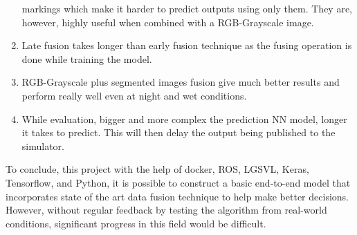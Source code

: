 \begin{enumerate}
        markings which make it harder to predict outputs using only them. They are,
        however, highly useful when combined with a RGB-Grayscale image.
    \item Late fusion takes longer than early fusion technique as the fusing operation is
        done while training the model.
    \item RGB-Grayscale plus segmented images fusion give much better results and perform really well even at night and wet conditions.
    \item While evaluation, bigger and more complex the prediction NN model, longer it
        takes to predict. This will then delay the output being published to the
        simulator.
\end{enumerate}

To conclude, this project with the help of docker, ROS, LGSVL, Keras, Tensorflow, and Python, it is possible to construct a basic end-to-end model that incorporates state of the art data fusion technique to help make better decisions. However, without regular feedback by testing the algorithm from real-world conditions, significant progress in this field would be difficult. 